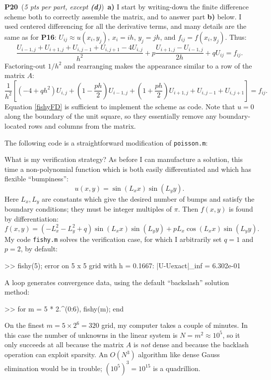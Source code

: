 \documentclass[11pt]{amsart}
\newcommand{\mfile}[2]{
\bigskip
\begin{quote}
\medskip
\VerbatimInput[frame=single,framesep=3mm,label=\fbox{\normalsize \textsl{\,#1\,}},fontfamily=courier,fontsize=\scriptsize]{#2}
\medskip
\end{quote}
}
\newcommand{\probpts}[2]{\bigskip\noindent\large \textbf{#1} \normalsize \,(\emph{#2})\,}
\newcommand{\ppart}[1]{\quad \textbf{#1)} }
\begin{document}
\probpts{P20}{5 pts per part, except \emph{\textbf{(d)}}}  \ppart{a}  I start by writing-down the finite difference scheme both to correctly assemble the matrix, and to answer part \textbf{b)} below.  I used centered differencing for all the derivative terms, and many details are the same as for \textbf{P16}: $U_{ij} \approx u(x_i,y_j)$, $x_i = i h$, $y_j = j h$, and $f_{ij} = f(x_i,y_j)$.  Thus:
\begin{equation*}
\frac{U_{i-1,j} + U_{i+1,j} + U_{i,j-1} + U_{i,j+1} - 4 U_{i,j}}{h^2} + p \frac{U_{i+1,j} - U_{i-1,j}}{2h} + q U_{ij} = f_{ij}.
\end{equation*}
Factoring-out $1/h^2$ and rearranging makes the appearance similar to a row of the matrix $A$:
\begin{equation}
\frac{1}{h^2} \left[(-4 + q h^2) U_{i,j} + \left(1 - \frac{p h}{2}\right) U_{i-1,j} + \left(1 + \frac{p h}{2}\right) U_{i+1,j} + U_{i,j-1} + U_{i,j+1}\right] = f_{ij}.
\label{fishyFD}
\end{equation}
Equation \eqref{fishyFD} is sufficient to implement the scheme as code.  Note that $u=0$ along the boundary of the unit square, so they essentially remove any boundary-located rows and columns from the matrix.

The following code is a straightforward modification of \texttt{poisson.m}:

\mfile{fishy.m}{fishy.m}

What is my verification strategy?  As before I can manufacture a solution, this time a non-polynomial function which is both easily differentiated and which has flexible ``bumpiness'':
    $$u(x,y) = \sin(L_x x) \sin(L_y y).$$
Here $L_x,L_y$ are constants which give the desired number of bumps and satisfy the boundary conditions; they must be integer multiples of $\pi$.  Then $f(x,y)$ is found by differentiation:
    $$f(x,y) = \left(-L_x^2-L_y^2+q\right) \sin(L_x x) \sin(L_y y) + p L_x \cos(L_x x) \sin(L_y y).$$
My code \texttt{fishy.m} solves the verification case, for which I arbitrarily set $q=1$ and $p=2$, by default:
\begin{mVerb}
>> fishy(5);
error on 5 x 5 grid with h = 0.1667:  |U-Uexact|_inf = 6.302e-01
\end{mVerb}

A loop generates convergence data, using the default ``backslash'' solution method:
\begin{mVerb}
>> for m = 5 * 2.^(0:6), fishy(m); end
\end{mVerb}
On the finest $m=5 \times 2^6 = 320$ grid, my computer takes a couple of minutes.  In this case the number of unknowns in the linear system is $N=m^2\approx 10^5$, so it only succeeds at all because the matrix $A$ is \emph{not} dense and because the backlash operation can exploit sparsity.  An $O(N^3)$ algorithm like dense Gauss elimination would be in trouble; $(10^5)^3 = 10^{15}$ is a quadrillion.
\end{document}
